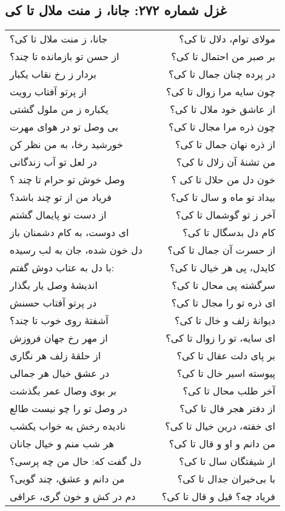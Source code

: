 \begin{center}
\section*{غزل شماره ۲۷۲: جانا، ز منت ملال تا کی}
\label{sec:272}
\begin{longtable}{l p{0.5cm} r}
جانا، ز منت ملال تا کی؟
&&
مولای توام، دلال تا کی؟
\\
از حسن تو بازمانده تا چند؟
&&
بر صبر من احتمال تا کی؟
\\
بردار ز رخ نقاب یکبار
&&
در پرده چنان جمال تا کی؟
\\
از پرتو آفتاب رویت
&&
چون سایه مرا زوال تا کی؟
\\
یکباره ز من ملول گشتی
&&
از عاشق خود ملال تا کی؟
\\
بی وصل تو در هوای مهرت
&&
چون ذره مرا مجال تا کی؟
\\
خورشید رخا، به من نظر کن
&&
از ذره نهان جمال تا کی؟
\\
در لعل تو آب زندگانی
&&
من تشنهٔ آن زلال تا کی؟
\\
وصل خوش تو حرام تا چند ؟
&&
خون دل من حلال تا کی ؟
\\
فریاد من از تو چند باشد؟
&&
بیداد تو ماه و سال تا کی؟
\\
از دست تو پایمال گشتم
&&
آخر ز تو گوشمال تا کی؟
\\
ای دوست، به کام دشمنان باز
&&
کام دل بدسگال تا کی؟
\\
دل خون شده، جان به لب رسیده
&&
از حسرت آن جمال تا کی؟
\\
با دل به عتاب دوش گفتم:
&&
کایدل، پی هر خیال تا کی؟
\\
اندیشهٔ وصل یار بگذار
&&
سرگشته پی محال تا کی؟
\\
در پرتو آفتاب حسنش
&&
ای ذره تو را مجال تا کی؟
\\
آشفتهٔ روی خوب تا چند؟
&&
دیوانهٔ زلف و خال تا کی؟
\\
از مهر رخ جهان فروزش
&&
ای سایه، تو را زوال تا کی؟
\\
از حلقهٔ زلف هر نگاری
&&
بر پای دلت عقال تا کی؟
\\
در عشق خیال هر جمالی
&&
پیوسته اسیر خال تا کی؟
\\
بر بوی وصال عمر بگذشت
&&
آخر طلب محال تا کی؟
\\
در وصل تو را چو نیست طالع
&&
از دفتر هجر فال تا کی؟
\\
نادیده رخش به خواب یکشب
&&
ای خفته، درین خیال تا کی؟
\\
هر شب منم و خیال جانان
&&
من دانم و او و قال تا کی؟
\\
دل گفت که: حال من چه پرسی؟
&&
از شیفتگان سال تا کی؟
\\
من دانم و عشق، چند گویی؟
&&
با بی‌خبران جدال تا کی؟
\\
دم در کش و خون گری، عراقی
&&
فریاد چه؟ قیل و قال تا کی؟
\\
\end{longtable}
\end{center}
